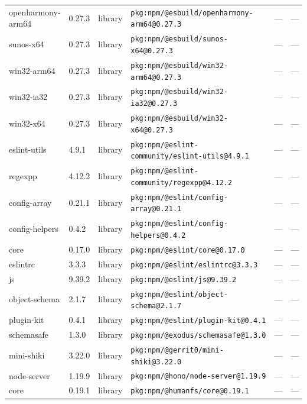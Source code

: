 \documentclass[11pt,a4paper]{article}
\begin{document}
\begin{longtable}{|p{4cm}|p{2cm}|p{1.6cm}|p{5cm}|p{1.5cm}|p{3.5cm}|}
\raggedright openharmony-arm64 & 0.27.3 & library & \small\texttt{pkg:npm/@esbuild/openharmony-arm64@0.27.3} & — & \small — \\
\raggedright sunos-x64 & 0.27.3 & library & \small\texttt{pkg:npm/@esbuild/sunos-x64@0.27.3} & — & \small — \\
\raggedright win32-arm64 & 0.27.3 & library & \small\texttt{pkg:npm/@esbuild/win32-arm64@0.27.3} & — & \small — \\
\raggedright win32-ia32 & 0.27.3 & library & \small\texttt{pkg:npm/@esbuild/win32-ia32@0.27.3} & — & \small — \\
\raggedright win32-x64 & 0.27.3 & library & \small\texttt{pkg:npm/@esbuild/win32-x64@0.27.3} & — & \small — \\
\raggedright eslint-utils & 4.9.1 & library & \small\texttt{pkg:npm/@eslint-community/eslint-utils@4.9.1} & — & \small — \\
\raggedright regexpp & 4.12.2 & library & \small\texttt{pkg:npm/@eslint-community/regexpp@4.12.2} & — & \small — \\
\raggedright config-array & 0.21.1 & library & \small\texttt{pkg:npm/@eslint/config-array@0.21.1} & — & \small — \\
\raggedright config-helpers & 0.4.2 & library & \small\texttt{pkg:npm/@eslint/config-helpers@0.4.2} & — & \small — \\
\raggedright core & 0.17.0 & library & \small\texttt{pkg:npm/@eslint/core@0.17.0} & — & \small — \\
\raggedright eslintrc & 3.3.3 & library & \small\texttt{pkg:npm/@eslint/eslintrc@3.3.3} & — & \small — \\
\raggedright js & 9.39.2 & library & \small\texttt{pkg:npm/@eslint/js@9.39.2} & — & \small — \\
\raggedright object-schema & 2.1.7 & library & \small\texttt{pkg:npm/@eslint/object-schema@2.1.7} & — & \small — \\
\raggedright plugin-kit & 0.4.1 & library & \small\texttt{pkg:npm/@eslint/plugin-kit@0.4.1} & — & \small — \\
\raggedright schemasafe & 1.3.0 & library & \small\texttt{pkg:npm/@exodus/schemasafe@1.3.0} & — & \small — \\
\raggedright mini-shiki & 3.22.0 & library & \small\texttt{pkg:npm/@gerrit0/mini-shiki@3.22.0} & — & \small — \\
\raggedright node-server & 1.19.9 & library & \small\texttt{pkg:npm/@hono/node-server@1.19.9} & — & \small — \\
\raggedright core & 0.19.1 & library & \small\texttt{pkg:npm/@humanfs/core@0.19.1} & — & \small — \\

\end{longtable}
\end{document}
